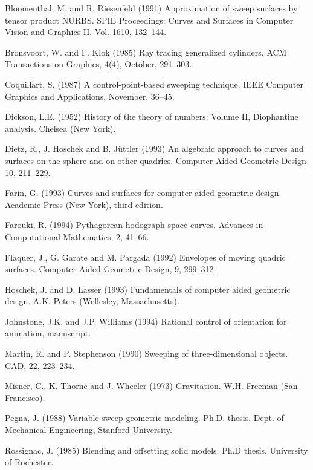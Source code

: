 
\begin{thebibliography}{Shoemake 85}

Bloomenthal, M. and R. Riesenfeld (1991)
Approximation of sweep surfaces by tensor product NURBS.
SPIE Proceedings: Curves and Surfaces in Computer Vision and Graphics II,
Vol. 1610, 132--144.

Bronsvoort, W. and F. Klok (1985)
Ray tracing generalized cylinders.
ACM Transactions on Graphics, 4(4), October, 291--303.

Coquillart, S. (1987)
A control-point-based sweeping technique.
IEEE Computer Graphics and Applications, November, 36--45.

Dickson, L.E. (1952) History of the theory of numbers: Volume II,
Diophantine analysis.  Chelsea (New York).

Dietz, R., J. Hoschek and B. J\"{u}ttler (1993)
An algebraic approach to curves and surfaces on the sphere and on other
quadrics.  Computer Aided Geometric Design 10, 211--229.

Farin, G. (1993) Curves and surfaces for computer aided geometric design.
Academic Press (New York), third edition.

Farouki, R. (1994)
Pythagorean-hodograph space curves.
Advances in Computational Mathematics, 2, 41--66.

Flaquer, J., G. Garate and M. Pargada (1992)
Envelopes of moving quadric surfaces.
Computer Aided Geometric Design, 9, 299--312.

Hoschek, J. and D. Lasser (1993)
Fundamentals of computer aided geometric design.
A.K. Peters (Wellesley, Massachusetts).

Johnstone, J.K. and J.P. Williams (1994) Rational control of orientation
for animation, manuscript.

Martin, R. and P. Stephenson (1990)
Sweeping of three-dimensional objects.
CAD, 22, 223--234.

Misner, C., K. Thorne and J. Wheeler (1973)
Gravitation.  W.H. Freeman (San Francisco).

Pegna, J. (1988) Variable sweep geometric modeling.
Ph.D. thesis, Dept. of Mechanical Engineering, Stanford University.

Rossignac, J. (1985)
Blending and offsetting solid models.
Ph.D thesis, University of Rochester.


\end{thebibliography}
